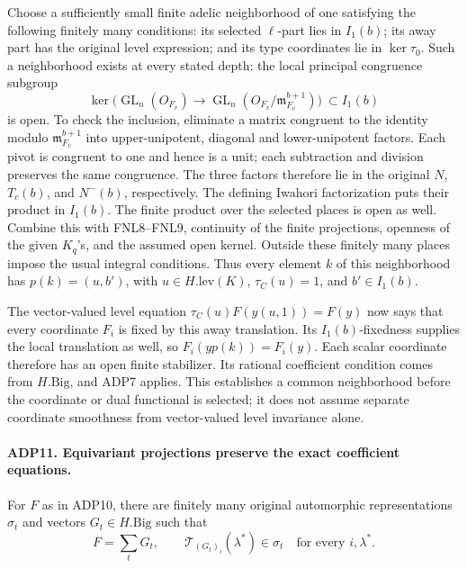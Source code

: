 Choose a sufficiently small finite adelic neighborhood of one satisfying
the following finitely many conditions: its selected \(\ell\)-part lies
in \(I_1(b)\); its away part has the original level expression; and
its type coordinates lie in \(\ker\tau_0\).  Such a neighborhood
exists at every stated depth: the local principal congruence subgroup
\[
 \ker\bigl(\operatorname{GL}_n(O_{F_v})\longrightarrow
              \operatorname{GL}_n(O_{F_v}/\mathfrak m_{F_v}^{b+1})\bigr)
                         \ \subset I_1(b)
\]
is open.  To check the inclusion, eliminate a matrix congruent to the
identity modulo \(\mathfrak m_{F_v}^{b+1}\) into upper-unipotent,
diagonal and lower-unipotent factors.  Each pivot is congruent to one
and hence is a unit; each subtraction and division preserves the same
congruence.  The three factors therefore lie in the original
\(N\), \(T_c(b)\), and \(N^-(b)\), respectively.  The defining
Iwahori factorization puts their product in \(I_1(b)\).  The finite
product over the selected places is open as well.  Combine this with
FNL8--FNL9, continuity of the finite projections, openness of
the given \(K_q\)'s, and the assumed open kernel.  Outside these
finitely many places impose the usual integral conditions.  Thus every
element \(k\) of this neighborhood has
\(p(k)=(u,b')\), with \(u\in H.\mathrm{lev}(K)\),
\(\tau_C(u)=1\), and \(b'\in I_1(b)\).

The vector-valued level equation
\(\tau_C(u)F(y(u,1))=F(y)\) now says that every coordinate \(F_i\)
is fixed by this away translation.  Its \(I_1(b)\)-fixedness supplies
the local translation as well, so \(F_i(yp(k))=F_i(y)\).
Each scalar coordinate therefore has an open finite stabilizer.  Its
rational coefficient condition comes from \(H.\mathrm{Big}\), and
ADP7 applies.  This establishes a common neighborhood before the
coordinate or dual functional is selected; it does not assume separate
coordinate smoothness from vector-valued level invariance alone.

\paragraph{ADP11. Equivariant projections preserve the exact coefficient equations.}
\label{claim:ADP11}
For \(F\) as in ADP10, there are finitely many original automorphic
representations \(\sigma_t\) and vectors \(G_t\in H.\mathrm{Big}\)
such that
\[
 F=\sum_tG_t,\qquad
            \mathcal T_{(G_t)_i}(\lambda^*)\in\sigma_t
                         \quad\text{for every }i,\lambda^*.
\]

